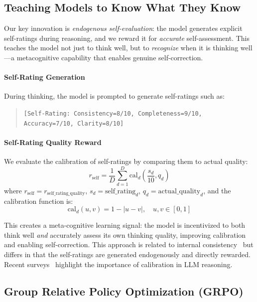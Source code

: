 \documentclass{article}
\theoremstyle{plain}
\theoremstyle{definition}
\theoremstyle{remark}
\begin{document}
\subsection{Teaching Models to Know What They Know}
\label{sec:endogenous}

Our key innovation is \textit{endogenous self-evaluation}: the model generates explicit self-ratings during reasoning, and we reward it for \textit{accurate} self-assessment. This teaches the model not just to think well, but to \textit{recognize} when it is thinking well---a metacognitive capability that enables genuine self-correction.

\paragraph{Self-Rating Generation} During thinking, the model is prompted to generate self-ratings such as:
\begin{quote}
\texttt{[Self-Rating: Consistency=8/10, Completeness=9/10, Accuracy=7/10, Clarity=8/10]}
\end{quote}

\paragraph{Self-Rating Quality Reward} We evaluate the calibration of self-ratings by comparing them to actual quality:
\begin{equation}
r_{\text{self}} = \frac{1}{D} \sum_{d=1}^{D} \text{cal}_d\!\left(\frac{s_d}{10}, q_d\right)
\end{equation}
where $r_{\text{self}} = r_{\text{self\_rating\_quality}}$, $s_d = \text{self\_rating}_d$, $q_d = \text{actual\_quality}_d$, and the calibration function is:
\begin{equation}
\text{cal}_d(u, v) = 1 - |u - v|, \quad u, v \in [0,1]
\end{equation}

This creates a meta-cognitive learning signal: the model is incentivized to both think well \textit{and} accurately assess its own thinking quality, improving calibration and enabling self-correction. This approach is related to internal consistency~\citep{liang2024internal_consistency, wang2023self} but differs in that the self-ratings are generated endogenously and directly rewarded. Recent surveys~\citep{liu2025uncertainty_survey, wang2025math_reasoning_survey} highlight the importance of calibration in LLM reasoning.

\subsection{Group Relative Policy Optimization (GRPO)}
\end{document}
